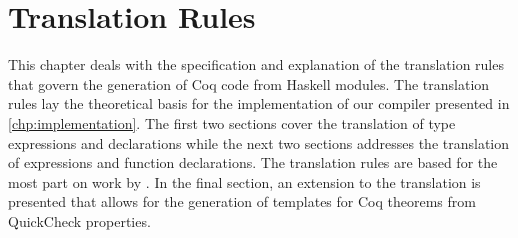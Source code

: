 \chapter{Translation Rules} \label{chp:translation}
This chapter deals with the specification and explanation of the translation rules that govern the generation of Coq code from Haskell modules.
The translation rules lay the theoretical basis for the implementation of our compiler presented in \autoref{chp:implementation}.
The first two sections cover the translation of type expressions and declarations while the next two sections addresses the translation of expressions and function declarations.
The translation rules are based for the most part on work by \cite{Abel:2005}.
In the final section, an extension to the translation is presented that allows for the generation of templates for Coq theorems from QuickCheck properties.






